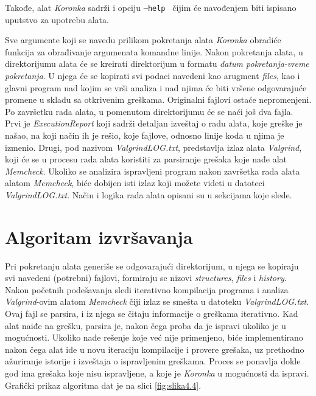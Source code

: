 \documentclass[12pt,oneside]{memoir}
\theoremstyle{plain}
\theoremstyle{definition}
\begin{document}
Takođe, alat \textit{Koronka} sadrži i opciju \texttt{--help } čijim će navođenjem biti ispisano uputstvo za upotrebu alata. 

Sve argumente koji se navedu prilikom pokretanja alata \textit{Koronka} obradiće funkcija za obrađivanje argumenata komandne linije. Nakon pokretanja alata, u direktorijumu alata će se kreirati direktorijum u formatu \textit{datum pokretanja-vreme pokretanja}. U njega će se kopirati svi podaci navedeni kao arugment \textit{files}, kao i glavni program nad kojim se vrši analiza i nad njima će biti vršene odgovarajuće promene u skladu sa otkrivenim greškama. Originalni fajlovi ostaće nepromenjeni. Po završetku rada alata, u pomenutom direktorijumu će se naći još dva fajla. Prvi je \textit{ExecutionReport} koji sadrži detaljan izveštaj o radu alata, koje greške je našao, na koji način ih je rešio, koje fajlove, odnosno linije koda u njima je izmenio. Drugi, pod nazivom \textit{ValgrindLOG.txt}, predstavlja izlaz alata \textit{Valgrind}, koji će se u procesu rada alata koristiti za parsiranje grešaka koje nađe alat \textit{Memcheck}. Ukoliko se analizira ispravljeni program nakon završetka rada alata alatom \textit{Memcheck}, biće dobijen isti izlaz koji možete videti u datoteci \textit{ValgrindLOG.txt}. Način i logika rada alata opisani su u sekcijama koje slede.

\section{Algoritam izvršavanja}\label{algoritam}
Pri pokretanju alata generiše se odgovarajući direktorijum, u njega se kopiraju svi navedeni (potrebni) fajlovi, formiraju se nizovi \textit{structures}, \textit{files} i \textit{history}. Nakon početnih podešavanja sledi iterativno kompilacija programa i analiza \textit{Valgrind}-ovim alatom \textit{Memcheck} čiji izlaz se smešta u datoteku \textit{ValgrindLOG.txt}. Ovaj fajl se parsira, i iz njega se čitaju informacije o greškama iterativno. Kad alat naiđe na grešku, parsira je, nakon čega proba da je ispravi ukoliko je u mogućnosti. Ukoliko nađe rešenje koje već nije primenjeno, biće implementirano nakon čega alat ide u novu iteraciju kompilacije i provere grešaka, uz prethodno ažuriranje istorije i izveštaja o ispravljenim greškama. Proces se ponavlja dokle god ima grešaka koje nisu ispravljene, a koje je \textit{Koronka} u mogućnosti da ispravi. Grafički prikaz algoritma dat je na slici \ref{fig:slika4.4}.
\end{document}
